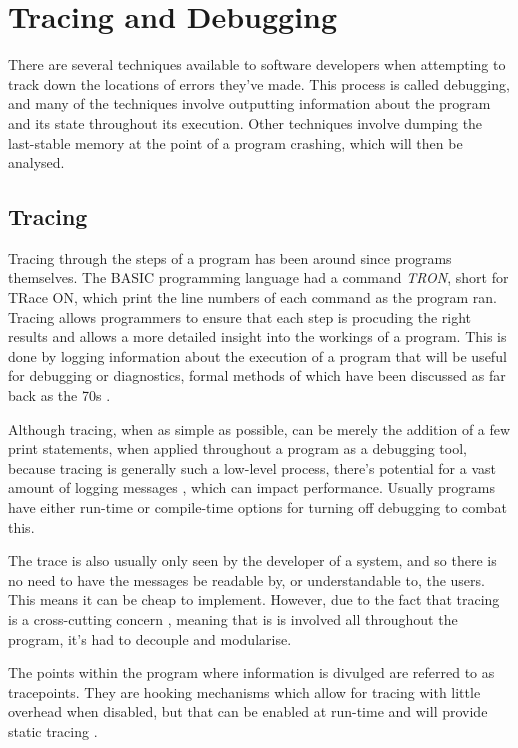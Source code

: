 \documentclass{UoYCSproject}
\begin{document}
\section{Tracing and Debugging}
There are several techniques available to software developers when attempting to track down the locations of errors they've made. This process is called debugging, and many of the techniques involve outputting information about the program and its state throughout its execution. Other techniques involve dumping the last-stable memory at the point of a program crashing, which will then be analysed. 

\subsection{Tracing}
Tracing through the steps of a program has been around since programs themselves. The BASIC programming language had a command \emph{TRON}, short for TRace ON, which print the line numbers of each command as the program ran. 
Tracing allows programmers to ensure that each step is procuding the right results and allows a more detailed insight into the workings of a program. This is done by logging information about the execution of a program that will be useful for debugging or diagnostics, formal methods of which have been discussed as far back as the 70s \cite{psych_debug, code_walkthroughs}.

Although tracing, when as simple as possible, can be merely the addition of a few print statements, when applied throughout a program as a debugging tool, because tracing is generally such a low-level process, there's potential for a vast amount of logging messages \cite{}, which can impact performance. Usually programs have either run-time or compile-time options for turning off debugging to combat this. 

The trace is also usually only seen by the developer of a system, and so there is no need to have the messages be readable by, or understandable to, the users. This means it can be cheap to implement. However, due to the fact that tracing is a cross-cutting concern \cite{}, meaning that is is involved all throughout the program, it's had to decouple and modularise.

The points within the program where information is divulged are referred to as tracepoints. They are hooking mechanisms which allow for tracing with little overhead when disabled, but that can be enabled at run-time and will provide static tracing \cite{tracing_book}.
\end{document}
